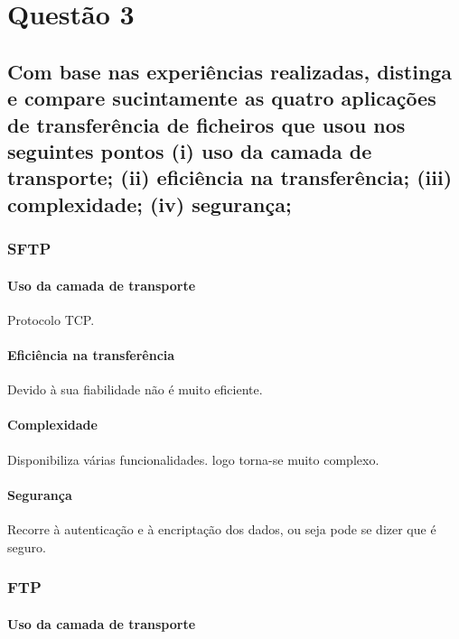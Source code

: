 \documentclass[a4paper]{report}
\begin{document}
\chapter{Questão 3}

\section{Com base nas experiências realizadas, distinga e compare sucintamente as quatro aplicações de transferência de ficheiros que
usou nos seguintes pontos (i) uso da camada de transporte; (ii) eficiência na transferência; (iii) complexidade; (iv) segurança;}

\subsection{SFTP}

\subsubsection{Uso da camada de transporte}

Protocolo TCP.

\subsubsection{Eficiência na transferência}

Devido à sua fiabilidade não é muito eficiente.

\subsubsection{Complexidade}

Disponibiliza várias funcionalidades. logo torna-se muito complexo.

\subsubsection{Segurança}

Recorre à autenticação e à encriptação dos dados, ou seja pode se dizer que é seguro.

\subsection{FTP}

\subsubsection{Uso da camada de transporte}
\end{document}
